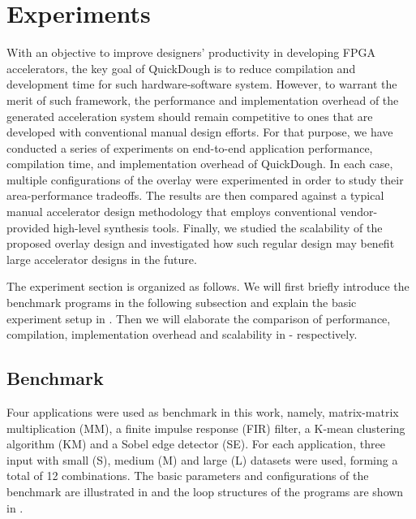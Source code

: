 \section{Experiments}\label{sec:experiments}
With an objective to improve designers' productivity in developing FPGA accelerators, the key goal
of QuickDough is to reduce compilation and development time for such hardware-software system.
However, to warrant the merit of such framework, the performance and implementation overhead of the
generated acceleration system should remain competitive to ones that are developed with conventional
manual design efforts. For that purpose, we have conducted a series of experiments on end-to-end
application performance, compilation time, and implementation overhead of QuickDough. In each case,
multiple configurations of the overlay were experimented in order to study their area-performance
tradeoffs. The results are then compared against a typical manual accelerator design methodology
that employs conventional vendor-provided high-level synthesis tools. Finally, we studied the
scalability of the proposed overlay design and investigated how such regular design may benefit
large accelerator designs in the future.



The experiment section is organized as follows. We will first briefly introduce the benchmark
programs in the following subsection and explain the basic experiment setup in
. Then we will elaborate the comparison of performance, compilation,
implementation overhead and scalability in -
respectively. 

\subsection{Benchmark} \label{subsec:benchmark}
Four applications were used as benchmark in this work, namely, matrix-matrix multiplication (MM), a
finite impulse response (FIR) filter, a K-mean clustering algorithm (KM) and a Sobel edge detector
(SE). For each application, three input with small (S), medium (M) and large (L) datasets were used,
forming a total of 12 combinations. The basic parameters and configurations of the benchmark are
illustrated in  and the loop structures of the programs are shown in
. 

